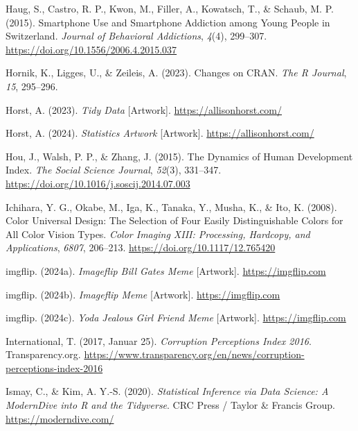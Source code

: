 \documentclass[
  letterpaper,
  oneside,
  open=any]{scrbook}
\newlength{\cslhangindent}
\newenvironment{CSLReferences}[2] %
 {\begin{list}{}{%
  \setlength{\itemindent}{0pt}
  \setlength{\leftmargin}{0pt}
  \setlength{\parsep}{0pt}
  \ifodd #1
   \setlength{\leftmargin}{\cslhangindent}
   \setlength{\itemindent}{-1\cslhangindent}
  \fi
  \setlength{\itemsep}{#2\baselineskip}}}
 {\end{list}}
\theoremstyle{definition}
\theoremstyle{definition}
\theoremstyle{definition}
\theoremstyle{remark}
\begin{document}
\begin{CSLReferences}{1}{0}
Haug, S., Castro, R. P., Kwon, M., Filler, A., Kowatsch, T., \& Schaub,
M. P. (2015). Smartphone Use and Smartphone Addiction among Young People
in {Switzerland}. \emph{Journal of Behavioral Addictions}, \emph{4}(4),
299--307. \url{https://doi.org/10.1556/2006.4.2015.037}

Hornik, K., Ligges, U., \& Zeileis, A. (2023). Changes on CRAN.
\emph{The R Journal}, \emph{15}, 295--296.

Horst, A. (2023). \emph{Tidy {Data}} {[}Artwork{]}.
\url{https://allisonhorst.com/}

Horst, A. (2024). \emph{Statistics {Artwork}} {[}Artwork{]}.
\url{https://allisonhorst.com/}

Hou, J., Walsh, P. P., \& Zhang, J. (2015). The Dynamics of {Human
Development Index}. \emph{The Social Science Journal}, \emph{52}(3),
331--347. \url{https://doi.org/10.1016/j.soscij.2014.07.003}

Ichihara, Y. G., Okabe, M., Iga, K., Tanaka, Y., Musha, K., \& Ito, K.
(2008). Color Universal Design: The Selection of Four Easily
Distinguishable Colors for All Color Vision Types. \emph{Color {Imaging
XIII}: {Processing}, {Hardcopy}, and {Applications}}, \emph{6807},
206--213. \url{https://doi.org/10.1117/12.765420}

imgflip. (2024a). \emph{Imageflip {Bill Gates Meme}} {[}Artwork{]}.
\url{https://imgflip.com}

imgflip. (2024b). \emph{Imageflip {Meme}} {[}Artwork{]}.
\url{https://imgflip.com}

imgflip. (2024c). \emph{Yoda {Jealous Girl Friend Meme}} {[}Artwork{]}.
\url{https://imgflip.com}

International, T. (2017, Januar 25). \emph{Corruption {Perceptions
Index} 2016}. Transparency.org.
\url{https://www.transparency.org/en/news/corruption-perceptions-index-2016}

Ismay, C., \& Kim, A. Y.-S. (2020). \emph{Statistical Inference via Data
Science: A {ModernDive} into {R} and the {Tidyverse}}. CRC Press /
Taylor \& Francis Group. \url{https://moderndive.com/}


\end{CSLReferences}
\end{document}
